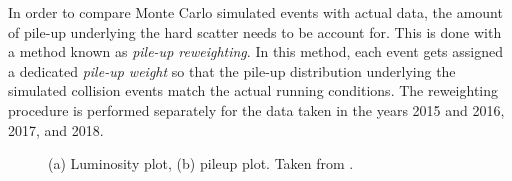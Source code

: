 In order to compare Monte Carlo simulated events with actual data, the amount of pile-up underlying the hard scatter needs to be account for. This is done with a method known as \emph{pile-up reweighting}. In this method, each event gets assigned a dedicated \emph{pile-up weight} so that the pile-up distribution underlying the simulated collision events match the actual running conditions. The reweighting procedure is performed separately for the data taken in the years 2015 and 2016, 2017, and 2018.



\begin{figure}
    \caption{(a) Luminosity plot, (b) pileup plot. Taken from .}
    \label{fig:run-2-data-taking}
\end{figure}


